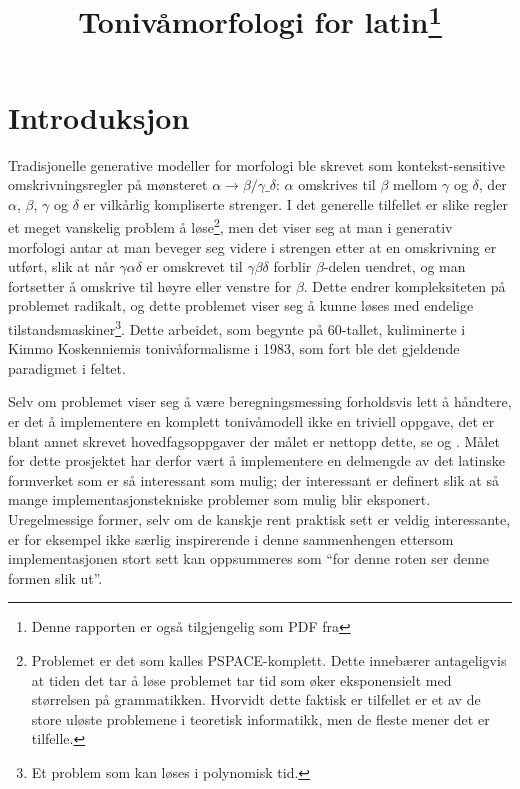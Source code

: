 \documentclass{article}
\title{Toniv\aa{}morfologi for latin\footnote{Denne rapporten er ogs\aa{}
tilgjengelig som PDF fra \link{http://heim.ifi.uio.no/arnskj/TODO}}}
\date{} %
\begin{document}
\maketitle

\section{Introduksjon}
Tradisjonelle generative modeller for morfologi ble skrevet som
kontekst-sensitive omskrivningsregler p\aa{} m\o{}nsteret $\alpha \to
\beta/\gamma \_ \delta$: $\alpha$ omskrives til $\beta$ mellom $\gamma$ og
$\delta$, der $\alpha$, $\beta$, $\gamma$ og $\delta$ er vilk\aa{}rlig
kompliserte strenger. I det generelle tilfellet er slike regler et meget
vanskelig problem \aa{} l\o{}se\footnote{Problemet er det som kalles
PSPACE-komplett. Dette inneb\ae{}rer antageligvis at tiden det tar \aa{}
l\o{}se problemet tar tid som \o{}ker eksponensielt med st\o{}rrelsen p\aa{}
grammatikken. Hvorvidt dette faktisk er tilfellet er et av de store ul\o{}ste
problemene i teoretisk informatikk, men de fleste mener det er tilfelle.}, men
det viser seg at man i generativ morfologi antar at man beveger seg videre i
strengen etter at en omskrivning er utf\o{}rt, slik at n\aa{}r
$\gamma\alpha\delta$ er omskrevet til $\gamma\beta\delta$ forblir
$\beta$-delen uendret, og man fortsetter \aa{} omskrive til h\o{}yre eller
venstre for $\beta$. Dette endrer kompleksiteten p\aa{} problemet radikalt, og
dette problemet viser seg \aa{} kunne l\o{}ses med endelige
tilstandsmaskiner\footnote{Et problem som kan l\o{}ses i polynomisk tid.}.
Dette arbeidet, som begynte p\aa{} 60-tallet, kuliminerte i Kimmo Koskenniemis
toniv\aa{}formalisme i 1983, som fort ble det gjeldende paradigmet i feltet. \cite{twolc}

Selv om problemet viser seg \aa{} v\ae{}re beregningsmessing forholdsvis lett
\aa{} h\aa{}ndtere, er det \aa{} implementere en komplett toniv\aa{}modell
ikke en triviell oppgave, det er blant annet skrevet hovedfagsoppgaver der
m\aa{}let er nettopp dette, se  og . M\aa{}let
for dette prosjektet har derfor v\ae{}rt \aa{} implementere en delmengde av
det latinske formverket som er s\aa{} interessant som mulig; der interessant
er definert slik at s\aa{} mange implementasjonstekniske problemer som mulig
blir eksponert. Uregelmessige former, selv om de kanskje rent praktisk sett er
veldig interessante, er for eksempel ikke s\ae{}rlig inspirerende i denne
sammenhengen ettersom implementasjonen stort sett kan oppsummeres som ``for
denne roten ser denne formen slik ut''.
\end{document}
